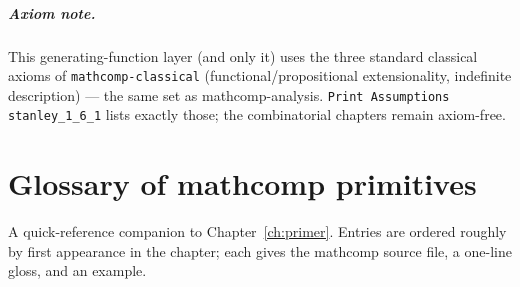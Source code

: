 \paragraph{Axiom note.} This generating-function layer (and only
it) uses the three standard classical axioms of
\texttt{mathcomp-classical} (functional/propositional
extensionality, indefinite description) --- the same set as
mathcomp-analysis.  \texttt{Print Assumptions stanley\_1\_6\_1}
lists exactly those; the combinatorial chapters remain axiom-free.

\appendix



\clearpage

\chapter{Glossary of mathcomp primitives}
\label{app:glossary}

A quick-reference companion to Chapter~\ref{ch:primer}. Entries are
ordered roughly by first appearance in the chapter; each gives the
mathcomp source file, a one-line gloss, and an example.

